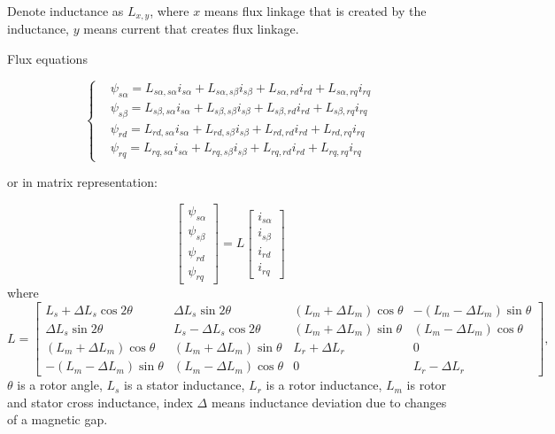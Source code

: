 \documentclass[11pt,a4paper,oneside]{report}
\begin{document}
Denote inductance as $L_{x,y}$, where $x$ means flux linkage that is created by the inductance, $y$ means current that creates flux linkage.

Flux equations

\begin{equation}
	\left\{
	\begin{split}
		& \psi_{s\alpha} = L_{s\alpha, s\alpha}i_{s\alpha}+ L_{s\alpha, s\beta}i_{s\beta}+L_{s\alpha, rd}i_{rd}+L_{s\alpha, rq}i_{rq} \\
		& \psi_{s\beta} = L_{s\beta, s\alpha}i_{s\alpha}+ L_{s\beta, s\beta}i_{s\beta}+L_{s\beta, rd}i_{rd}+L_{s\beta, rq}i_{rq} \\
		& \psi_{rd} = L_{rd, s\alpha}i_{s\alpha}+ L_{rd, s\beta}i_{s\beta}+L_{rd, rd}i_{rd}+L_{rd, rq}i_{rq} \\
		& \psi_{rq} = L_{rq, s\alpha}i_{s\alpha}+ L_{rq, s\beta}i_{s\beta}+L_{rq, rd}i_{rd}+L_{rq, rq}i_{rq} 
	\end{split}
	\right.
\end{equation}

or in matrix representation:

\begin{equation}
	\left[ 
	\begin{split}
		\psi_{s\alpha} \\ \psi_{s\beta} \\ \psi_{rd} \\ \psi_{rq}
	\end{split}
	\right]=L\left[
	\begin{split}
		i_{s\alpha} \\ i_{s\beta} \\ i_{rd} \\ i_{rq}
	\end{split}
	\right]
\end{equation}
where
\begin{equation}
	L=\left[
	\begin{array}{cccc}
		L_s+\Delta L_s\cos 2\theta & \Delta L_s\sin 2\theta & (L_m+\Delta L_m)\cos\theta & -(L_m-\Delta L_m)\sin\theta \\
		\Delta L_s\sin 2\theta & L_s - \Delta L_s \cos 2\theta & (L_m+\Delta L_m)\sin\theta & (L_m-\Delta L_m)\cos\theta \\
		(L_m+\Delta L_m)\cos\theta & (L_m+\Delta L_m)\sin\theta & L_r+\Delta L_r & 0 \\
		-(L_m-\Delta L_m)\sin\theta & (L_m-\Delta L_m)\cos\theta & 0 & L_r- \Delta L_r
	\end{array}
	\right],
\end{equation}
$\theta$ is a rotor angle, $L_s$ is a stator inductance, $L_r$ is a rotor inductance, $L_m$ is rotor and stator cross inductance, index $\Delta$ means inductance deviation due to changes of a magnetic gap.
\end{document}
